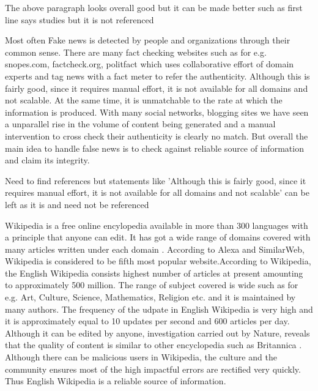 \documentclass[a4paper, 11pt]{article}
\begin{document}
\color{red}
The above paragraph looks overall good but it can be made better such as first line says studies but it is not referenced
\color{black}

Most often Fake news is detected by people and organizations through their common sense. There are many fact checking websites such as for e.g. snopes.com, factcheck.org, politfact which uses collaborative effort of domain experts and tag news with a fact meter to refer the authenticity. Although this is fairly good, since it requires manual effort, it is not available for all domains and not scalable. At the same time, it is unmatchable to the rate at which the information is produced. With many social networks, blogging sites we have seen a unparallel rise in the volume of content being generated and a manual intervention to cross check their authenticity is clearly no match. But overall the main idea to handle false news is to check against reliable source of information and claim its integrity.

\color{red}
 Need to find references but statements like 'Although this is fairly good, since it requires manual effort, it is not available for all domains and not scalable' can be left as it is and need not be referenced
\color{black}

 Wikipedia is a free online encylopedia available in more than 300 languages with a principle that anyone can edit. It has got a wide range of domains covered with many articles written under each domain \cite{Wales2005}. According to Alexa and SimilarWeb, Wikipedia is considered to be fifth most popular website.According to Wikipedia, the English Wikipedia consists highest number of articles at present amounting to approximately 500 million. The range of subject covered is wide such as for e.g. Art, Culture, Science, Mathematics, Religion etc. and it is maintained by many authors. The frequency of the udpate in English Wikipedia is very high and it is approximately equal to 10 updates per second and 600 articles per day. Although it can be edited by anyone, investigation carried out by Nature, reveals that the quality of content is similar to other encyclopedia such as Britannica \cite{Wales2005}. Although there can be malicious users in Wikipedia, the culture and the community ensures most of the high impactful errors are rectified very quickly\cite{Priedhorsky2007}. Thus English Wikipedia is a reliable source of information.
 
\end{document}
